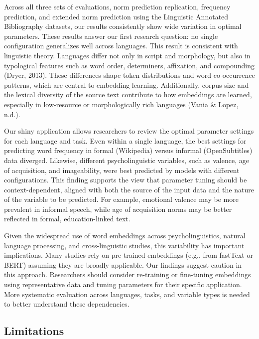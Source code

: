 \documentclass[
  man,floatsintext]{apa6}
\begin{document}
Across all three sets of evaluations, norm prediction replication, frequency prediction, and extended norm prediction using the Linguistic Annotated Bibliography datasets, our results consistently show wide variation in optimal parameters. These results answer our first research question: no single configuration generalizes well across languages. This result is consistent with linguistic theory. Languages differ not only in script and morphology, but also in typological features such as word order, determiners, affixation, and compounding (Dryer, 2013). These differences shape token distributions and word co-occurrence patterns, which are central to embedding learning. Additionally, corpus size and the lexical diversity of the source text contribute to how embeddings are learned, especially in low-resource or morphologically rich languages (Vania \& Lopez, n.d.).

Our shiny application allows researchers to review the optimal parameter settings for each language and task. Even within a single language, the best settings for predicting word frequency in formal (Wikipedia) versus informal (OpenSubtitles) data diverged. Likewise, different psycholinguistic variables, such as valence, age of acquisition, and imageability, were best predicted by models with different configurations. This finding supports the view that parameter tuning should be context-dependent, aligned with both the source of the input data and the nature of the variable to be predicted. For example, emotional valence may be more prevalent in informal speech, while age of acquisition norms may be better reflected in formal, education-linked text.

Given the widespread use of word embeddings across psycholinguistics, natural language processing, and cross-linguistic studies, this variability has important implications. Many studies rely on pre-trained embeddings (e.g., from fastText or BERT) assuming they are broadly applicable. Our findings suggest caution in this approach. Researchers should consider re-training or fine-tuning embeddings using representative data and tuning parameters for their specific application. More systematic evaluation across languages, tasks, and variable types is needed to better understand these dependencies.

\subsection{Limitations}\label{limitations}
\end{document}
